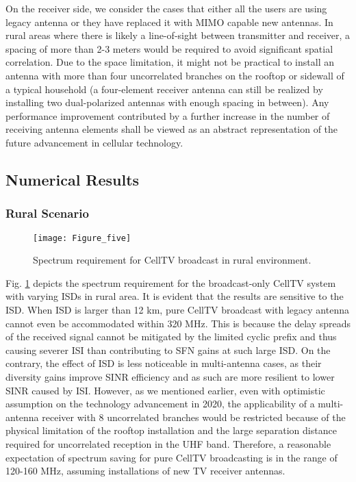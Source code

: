 \documentclass[journal]{IEEEtran}
\begin{document}
On the receiver side, we consider the cases that either all the users are using legacy antenna or they have replaced it with MIMO capable new antennas. In rural areas where there is likely a line-of-sight between transmitter and receiver, a spacing of more than 2-3 meters \cite{MIMO} would be required to avoid significant spatial correlation. Due to the space limitation, it might not be practical to install an antenna with more than four uncorrelated branches on the rooftop or sidewall of a typical household (a four-element receiver antenna can still be realized by installing two dual-polarized antennas with enough spacing in between). Any performance improvement contributed by a further increase in the number of receiving antenna elements shall be viewed as an abstract representation of the future advancement in cellular technology.




\subsection{Numerical Results }
\subsubsection{\textbf{Rural Scenario}}
  \begin{figure}[t]
  \centering
  \texttt{[image: Figure\_five]}\\
  \caption{Spectrum requirement for CellTV broadcast in rural environment.}\label{fig:Broad_rural}
\end{figure}
Fig. \ref{fig:Broad_rural} depicts the spectrum requirement for the broadcast-only CellTV system with varying ISDs in rural area. It is evident that the results are sensitive to the ISD. When ISD is larger than 12 km, pure CellTV broadcast with legacy antenna cannot even be accommodated within 320 MHz. This is because the delay spreads of the received signal cannot be mitigated by the limited cyclic prefix and thus causing severer ISI than contributing to SFN gains at such large ISD. On the contrary, the effect of ISD is less noticeable in multi-antenna cases, as their diversity gains improve SINR efficiency and as such are more resilient to lower SINR caused by ISI. However, as we mentioned earlier, even with optimistic assumption on the technology advancement in 2020, the applicability of a multi-antenna receiver with 8 uncorrelated branches would be restricted because of the physical limitation of the rooftop installation and the large separation distance required for uncorrelated reception in the UHF band. Therefore, a reasonable expectation of spectrum saving for pure CellTV broadcasting is in the range of 120-160 MHz, assuming installations of new TV receiver antennas.
\end{document}

